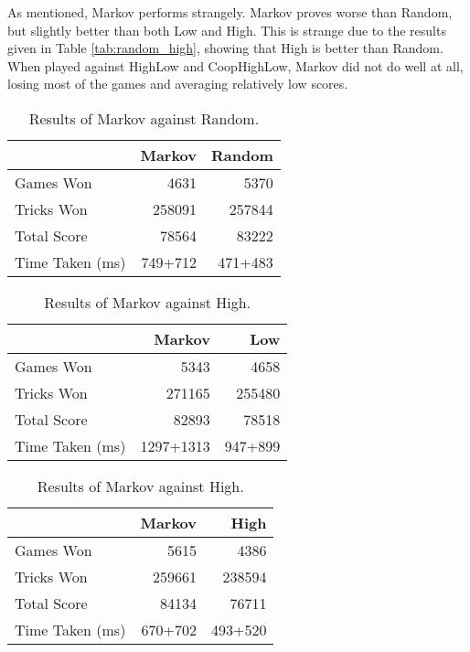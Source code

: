As mentioned, Markov performs strangely. Markov proves worse than Random, but slightly better than both Low and High. This is strange due to
the results given in Table \ref{tab:random_high}, showing that High is better than Random. When played against HighLow and CoopHighLow, Markov
did not do well at all, losing most of the games and averaging relatively low scores.

\begin{table}[ht]
    \centering
    \begin{tabular}{l|rr}
        ~               &   Markov &   Random  \\  \hline
        Games Won       &   4631        &   5370   \\
        Tricks Won      &   258091      &   257844 \\
        Total Score     &   78564       &   83222  \\
        Time Taken (ms) &   749+712   &   471+483
    \end{tabular}
    \caption{Results of Markov against Random.}
    \label{tab:markov_random}
\end{table}

\begin{table}[ht]
    \begin{minipage}{.5\linewidth}
        \centering
        \begin{tabular}{l|rr}
            ~               &   Markov &   Low  \\  \hline
            Games Won       &   5343        &   4658   \\
            Tricks Won      &   271165      &   255480 \\
            Total Score     &   82893       &   78518  \\
            Time Taken (ms) &   1297+1313   &   947+899
        \end{tabular}
        \caption{Results of Markov against Low.}
        \label{tab:markov_low}
    \end{minipage}%
    \begin{minipage}{.5\linewidth}
        \centering
        \begin{tabular}{l|rr}
            ~               &   Markov &   High  \\  \hline
            Games Won       &   5615        &   4386   \\
            Tricks Won      &   259661      &   238594 \\
            Total Score     &   84134       &   76711  \\
            Time Taken (ms) &   670+702   &   493+520
        \end{tabular}
        \caption{Results of Markov against High.}
        \label{tab:markov_high}
    \end{minipage} 
\end{table}


